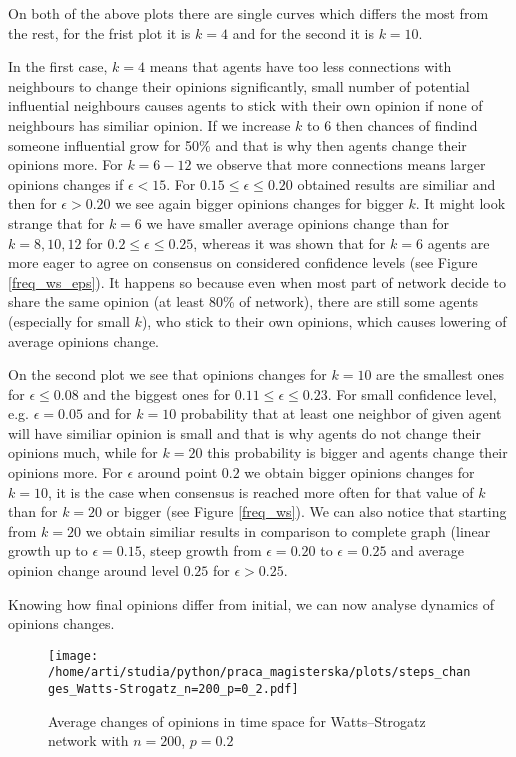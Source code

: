 \documentclass{article}
\begin{document}
On both of the above plots there are single curves which differs the most from the rest, for the frist plot it is $k=4$ and for the second it is $k=10$. 
\indent

In the first case, $k=4$ means that agents have too less connections with neighbours to change their opinions significantly, small number of potential influential neighbours causes agents to stick with their own opinion if none of neighbours has similiar opinion. If we increase $k$ to $6$ then chances of findind someone influential grow for 50\% and that is why then agents change their opinions more. For $k=6-12$ we observe that more connections means larger opinions changes if $\epsilon < 15$. For $0.15 \leq \epsilon \leq 0.20$ obtained results are similiar and then for $\epsilon > 0.20$ we see again   bigger opinions changes for bigger $k$. It might look strange that for $k=6$ we have smaller average opinions change than for $k=8, 10, 12$ for $0.2 \leq \epsilon \leq 0.25$, whereas it was shown that for $k=6$ agents are more eager to agree on consensus on considered confidence levels (see Figure \ref{freq_ws_eps}). It happens so because even when most part of network decide to share the same opinion (at least 80\% of network), there are still some agents (especially for small $k$), who stick to their own opinions, which causes lowering of average opinions change.
\indent

On the second plot we see that opinions changes for $k=10$ are the smallest ones for $\epsilon \leq 0.08$ and the biggest ones for $0.11 \leq \epsilon \leq 0.23$. For small confidence level, e.g. $\epsilon=0.05$ and for $k=10$ probability that at least one neighbor of given agent will have similiar opinion is small and that is why agents do not change their opinions much, while for $k=20$ this probability is bigger and agents change their opinions more. For $\epsilon$ around point $0.2$ we obtain bigger opinions changes for $k=10$, it is the case when consensus is reached more often for that value of $k$ than for $k=20$ or bigger (see Figure \ref{freq_ws}). We can also notice that starting from $k=20$ we obtain similiar results in comparison to complete graph (linear growth up to $\epsilon=0.15$, steep growth from $\epsilon=0.20$ to $\epsilon=0.25$ and average opinion change around level $0.25$ for $\epsilon>0.25$.

\indent

Knowing how final opinions differ from initial, we can now analyse dynamics of opinions changes.

\begin{figure}[H]
		\centering
		\texttt{[image: /home/arti/studia/python/praca\_magisterska/plots/steps\_changes\_Watts-Strogatz\_n=200\_p=0\_2.pdf]}
		\caption{Average changes of opinions in time space for Watts--Strogatz network with $n=200$, $p=0.2$}
\end{figure}
\end{document}
